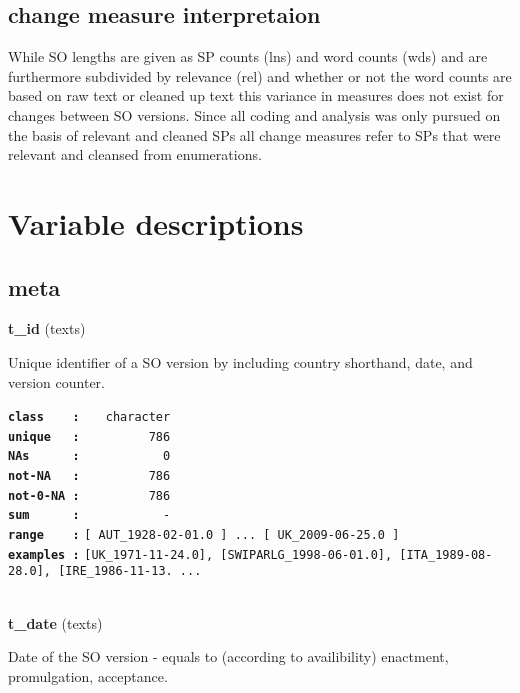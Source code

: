 \documentclass[]{article}
\begin{document}
\subsection{change measure
interpretaion}\label{change-measure-interpretaion}

While SO lengths are given as SP counts (lns) and word counts (wds) and
are furthermore subdivided by relevance (rel) and whether or not the
word counts are based on raw text or cleaned up text this variance in
measures does not exist for changes between SO versions. Since all
coding and analysis was only pursued on the basis of relevant and
cleaned SPs all change measures refer to SPs that were relevant and
cleansed from enumerations.

\section{Variable descriptions}\label{variable-descriptions}

\subsection{meta}\label{meta}

\textbf{t\_id} (texts)

Unique identifier of a SO version by including country shorthand, date,
and version counter.

\textbf{\texttt{class\ \ \ \ :}} \texttt{~~~character}\\
\textbf{\texttt{unique\ \ \ :}} \texttt{~~~~~~~~~786}\\
\textbf{\texttt{NAs\ \ \ \ \ \ :}} \texttt{~~~~~~~~~~~0}\\
\textbf{\texttt{not-NA\ \ \ :}} \texttt{~~~~~~~~~786}\\
\textbf{\texttt{not-0-NA\ :}} \texttt{~~~~~~~~~786}\\
\textbf{\texttt{sum\ \ \ \ \ \ :}} \texttt{~~~~~~~~~~~-}\\
\textbf{\texttt{range\ \ \ \ :}}
\texttt{{[}\ AUT\_1928-02-01.0\ {]}\ ...\ {[}\ UK\_2009-06-25.0\ {]}}\\
\textbf{\texttt{examples\ :}}
\texttt{{[}UK\_1971-11-24.0{]},\ {[}SWIPARLG\_1998-06-01.0{]},\ {[}ITA\_1989-08-28.0{]},\ {[}IRE\_1986-11-13.\ ...}\\

~

\textbf{t\_date} (texts)

Date of the SO version - equals to (according to availibility)
enactment, promulgation, acceptance.
\end{document}
